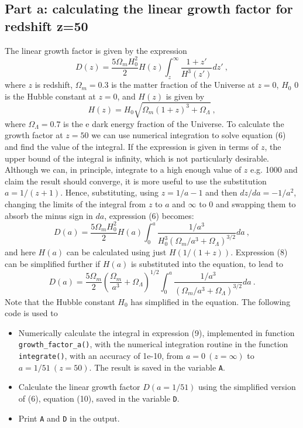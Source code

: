\documentclass{article}
\begin{document}
\subsection{Part a: calculating the linear growth factor for redshift z=50}
The linear growth factor is given by the expression
\begin{equation}
    D(z) = \frac{5\Omega_m H_0^2}{2}H(z)\int_z^\infty{\frac{1+z'}{H^3(z')}dz'} \ ,
\end{equation}
where $z$ is redshift, $\Omega_m = 0.3$ is the matter fraction of the Universe at $z = 0$, $H_0$ 0 is the Hubble constant at $z = 0$, and $H(z)$ is given by
\begin{equation}
    H(z) = H_0\sqrt{\Omega_m(1+z)^3+\Omega_{\Lambda}} \ ,
\end{equation}
where $\Omega_{\Lambda} = 0.7$ is the e dark energy fraction of the Universe. To calculate the growth factor at $z = 50$ we can use numerical integration to solve equation (6) and find the value of the integral. If the expression is given in terms of $z$, the upper bound of the integral is infinity, which is not particularly desirable. Although we can, in principle, integrate to a high enough value of $z$ e.g. 1000 and claim the result should converge, it is more useful to use the substitution $a = 1/(z+1)$. Hence, substituting, using $z = 1/a - 1$ and then $dz/da = -1/a^2$, changing the limits of the integral from $z$ to $a$ and $\infty$ to $0$ and swapping them to absorb the minus sign in $da$, expression (6) becomes:
\begin{equation}
    D(a) = \frac{5\Omega_m H_0^2}{2}H(a)\int_0^{a} \frac{1/a^3}{H_0^3(\Omega_m/a^3 + \Omega_{\Lambda})^{3/2}}da \ ,
\end{equation}
and here $H(a)$ can be calculated using just $H(1/(1+z))$. Expression (8) can be simplified further if $H(a)$ is substituted into the equation, to lead to
\begin{equation}
    D(a) = \frac{5\Omega_m}{2}\left(\frac{\Omega_m}{a^3}+\Omega_{\Lambda}\right)^{1/2 }\int_0^{a} \frac{1/a^3}{(\Omega_m/a^3 + \Omega_{\Lambda})^{3/2}}da \ .
\end{equation}
Note that the Hubble constant $H_0$ has simplified in the equation. The following code is used to
\begin{itemize}
    \item Numerically calculate the integral in expression (9), implemented in function \verb+growth_factor_a()+, with the numerical integration routine in the function \verb+integrate()+, with an accuracy of 1e-10, from $a = 0 \ (z = \infty)$ to $a = 1/51 \ (z = 50)$. The result is saved in the variable \verb+A+.
    \item Calculate the linear growth factor $D(a=1/51)$ using the simplified version of (6), equation (10), saved in the variable \verb+D+. 
    \item Print \verb+A+ and \verb+D+ in the output.
\end{itemize}

\end{document}
